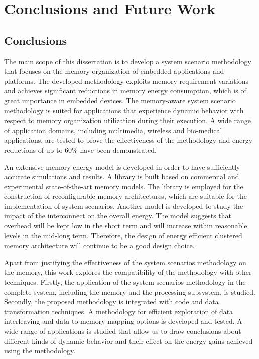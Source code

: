 \chapter{Conclusions and Future Work}
\label{conclusions}

\section{Conclusions}

The main scope of this dissertation is to develop a system scenario methodology that focuses on the memory organization of embedded applications and platforms. 
The developed methodology exploits memory requirement variations and achieves significant reductions in memory energy consumption, which is of great importance in embedded devices. 
The memory-aware system scenario methodology is suited for applications that experience dynamic behavior with respect to memory organization utilization during their execution.
A wide range of application domains, including multimedia, wireless and bio-medical applications, are tested to prove the effectiveness of the methodology and energy reductions of up to 60\% have been demonstrated.

An extensive memory energy model is developed in order to have sufficiently accurate simulations and results.
A library is built based on commercial and experimental state-of-the-art memory models.
The library is employed for the construction of reconfigurable memory architectures, which are suitable for the implementation of system scenarios.
Another model is developed to study the impact of the interconnect on the overall energy.
The model suggests that overhead will be kept low in the short term and will increase within reasonable levels in the mid-long term.
Therefore, the design of energy efficient clustered memory architecture will continue to be a good design choice.

Apart from justifying the effectiveness of the system scenarios methodology on the memory, this work explores the compatibility of the methodology with other techniques.
Firstly, the application of the system scenarios methodology in the complete system, including the memory and the processing subsystem, is studied.
Secondly, the proposed methodology is integrated with code and data transformation techniques.
A methodology for efficient exploration of data interleaving and data-to-memory mapping options is developed and tested.
A wide range of applications is studied that allow us to draw conclusions about different kinds of dynamic behavior and their effect on the energy gains achieved using the methodology. 

